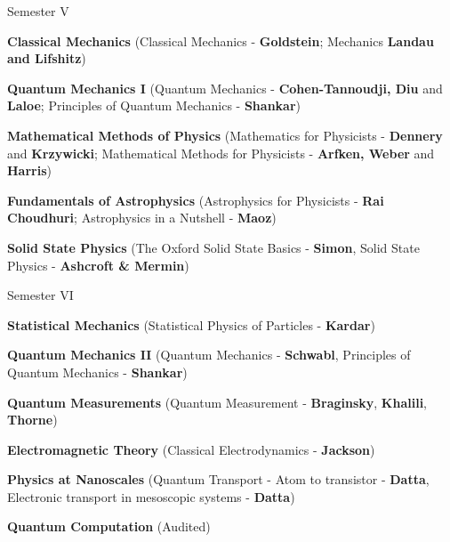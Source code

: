 \begin{cventries}
  \cventry
    {Semester V} %
    {} %
    {} %
    {} %
    {
      \begin{cvitems} %
        \item {\textbf{Classical Mechanics} (Classical Mechanics - \textbf{Goldstein}; Mechanics \textbf{Landau and Lifshitz}) }
        \item {\textbf{Quantum Mechanics I} (Quantum Mechanics - \textbf{Cohen-Tannoudji, Diu} and \textbf{Laloe}; Principles of Quantum Mechanics - \textbf{Shankar}) }
        \item {\textbf{Mathematical Methods of Physics} (Mathematics for Physicists - \textbf{Dennery} and \textbf{Krzywicki}; Mathematical Methods for Physicists - \textbf{Arfken, Weber} and \textbf{Harris})}
    	\item {\textbf{Fundamentals of Astrophysics} (Astrophysics for Physicists - \textbf{Rai Choudhuri}; Astrophysics in a Nutshell - \textbf{Maoz})}
    	\item {\textbf{Solid State Physics} (The Oxford Solid State Basics - \textbf{Simon}, Solid State Physics - \textbf{Ashcroft \& Mermin})}
      \end{cvitems}
    }
	\cventry
	{Semester VI} %
	{} %
	{} %
	{} %
	{
	\begin{cvitems} %
		\item {\textbf{Statistical Mechanics} (Statistical Physics of Particles - \textbf{Kardar})}
		\item {\textbf{Quantum Mechanics II} (Quantum Mechanics - \textbf{Schwabl}, Principles of Quantum Mechanics - \textbf{Shankar})}
		\item {\textbf{Quantum Measurements} (Quantum Measurement - \textbf{Braginsky}, \textbf{Khalili}, \textbf{Thorne})}
		\item {\textbf{Electromagnetic Theory} (Classical Electrodynamics - \textbf{Jackson})}
		\item {\textbf{Physics at Nanoscales} (Quantum Transport - Atom to transistor - \textbf{Datta}, Electronic transport in mesoscopic systems - \textbf{Datta})}
		\item {\textbf{Quantum Computation} (Audited)}
	\end{cvitems}
	}

\end{cventries}
